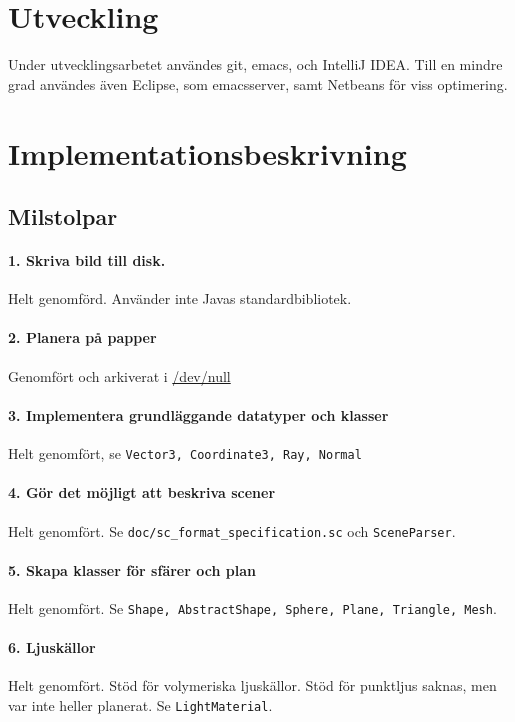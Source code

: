 \documentclass{article}
\begin{document}
\section{Utveckling}
Under utvecklingsarbetet användes git, emacs, och IntelliJ IDEA. Till
en mindre grad användes även Eclipse, som emacsserver, samt Netbeans
för viss optimering.

\section{Implementationsbeskrivning}
\subsection{Milstolpar}
\paragraph{1. Skriva bild till disk.}
Helt genomförd. Använder inte Javas standardbibliotek.

\paragraph{2. Planera på papper}
Genomfört och arkiverat i \url{/dev/null}

\paragraph{3. Implementera grundläggande datatyper och klasser}
Helt genomfört, se \texttt{Vector3, Coordinate3, Ray, Normal}

\paragraph{4. Gör det möjligt att beskriva scener}
Helt genomfört. Se \texttt{doc/sc\_format\_specification.sc} och
\texttt{SceneParser}.

\paragraph{5. Skapa klasser för sfärer och plan}
Helt genomfört. Se \texttt{Shape, AbstractShape, Sphere, Plane, Triangle, Mesh}.

\paragraph{6. Ljuskällor}
Helt genomfört. Stöd för volymeriska ljuskällor. Stöd för punktljus
saknas, men var inte heller planerat. Se \texttt{LightMaterial}.
\end{document}
